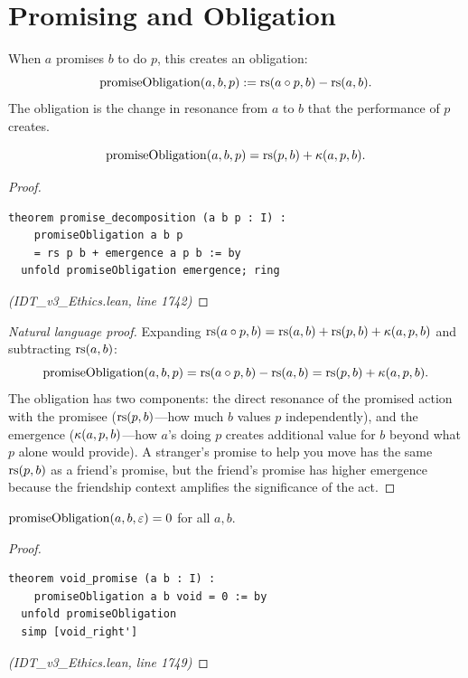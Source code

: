 \section{Promising and Obligation}
\label{sec:promising}

\begin{definition}
\label{def:promise-obligation}
When $a$ promises $b$ to do $p$, this creates an obligation:
\[
  \mathrm{promiseObligation}(a, b, p) := \mathrm{rs}(a \circ p, b) - \mathrm{rs}(a, b).
\]
The obligation is the change in resonance from $a$ to $b$ that the
performance of $p$ creates.
\end{definition}

\begin{theorem}
\label{thm:promise-decomp}
\[
  \mathrm{promiseObligation}(a, b, p) = \mathrm{rs}(p, b) + \kappa(a, p, b).
\]
\end{theorem}

\begin{proof}
\begin{lstlisting}
theorem promise_decomposition (a b p : I) :
    promiseObligation a b p
    = rs p b + emergence a p b := by
  unfold promiseObligation emergence; ring
\end{lstlisting}
\textit{(IDT\_v3\_Ethics.lean, line 1742)}
\end{proof}

\begin{proof}[Natural language proof]
Expanding $\mathrm{rs}(a \circ p, b) = \mathrm{rs}(a, b) + \mathrm{rs}(p, b) + \kappa(a, p, b)$
and subtracting $\mathrm{rs}(a, b)$:
\[
  \mathrm{promiseObligation}(a, b, p) = \mathrm{rs}(a \circ p, b) - \mathrm{rs}(a, b)
  = \mathrm{rs}(p, b) + \kappa(a, p, b).
\]
The obligation has two components: the direct resonance of the promised action
with the promisee ($\mathrm{rs}(p, b)$---how much $b$ values $p$ independently), and
the emergence ($\kappa(a, p, b)$---how $a$'s doing $p$ creates additional
value for $b$ beyond what $p$ alone would provide). A stranger's promise to
help you move has the same $\mathrm{rs}(p, b)$ as a friend's promise, but the
friend's promise has higher emergence because the friendship context amplifies
the significance of the act.
\end{proof}

\begin{theorem}
\label{thm:void-promise}
$\mathrm{promiseObligation}(a, b, \varepsilon) = 0$ for all $a, b$.
\end{theorem}

\begin{proof}
\begin{lstlisting}
theorem void_promise (a b : I) :
    promiseObligation a b void = 0 := by
  unfold promiseObligation
  simp [void_right']
\end{lstlisting}
\textit{(IDT\_v3\_Ethics.lean, line 1749)}
\end{proof}

